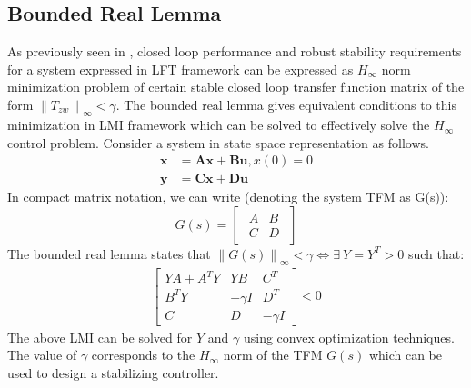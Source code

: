 \documentclass[a4paper,12pt]{article}
\newcommand\norm[1]{\left\lVert#1\right\rVert}
\begin{document}
	\subsection{Bounded Real Lemma}
	\label{brl}
	As previously seen in \cite{prev}, closed loop performance and robust stability requirements for a system expressed in LFT framework can be expressed as $H_{\infty}$ norm minimization problem of certain stable closed loop transfer function matrix of the form $\norm{T_{zw}}_{\infty} < \gamma$. 
	The bounded real lemma gives equivalent conditions to this minimization in LMI framework which can be solved to effectively solve the $H_{\infty}$ control problem. Consider a system in state space representation as follows.
	\begin{align}
	\label{ss}
		\textbf{\.x}&=\textbf{Ax} + \textbf{Bu}, x(0)=0\\
		\textbf{y}&=\textbf{Cx} + \textbf{Du}
		\end{align}
		In compact matrix notation, we can write (denoting the system TFM as G(s)):
		\[G(s)=\begin{bmatrix}
		\begin{array}{c|c}
		A & B \\\hline C & D
		\end{array}
		\end{bmatrix}
		\]
		The bounded real lemma states that 
		$\norm{G(s)}_{\infty}<\gamma \Leftrightarrow \exists \: Y = Y^{T} > 0$ such that:
		\begin{align}
		\label{brl_lmi}
		\begin{bmatrix}
		YA+A^{T}Y & YB & C^{T} \\
		B^{T}Y & -\gamma I & D^{T}\\
		C & D & -\gamma I
		\end{bmatrix}
		< 0
		\end{align}
		The above LMI can be solved for $Y$ and $\gamma$ using convex optimization techniques. The value of $\gamma$ corresponds to the $H_{\infty}$ norm of the TFM $G(s)$ which can be used to design a stabilizing controller. 
\end{document}
